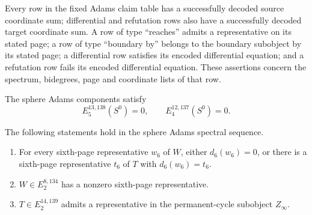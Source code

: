 \begin{theorem}
\label{frontier:AdamsCalculations:84a3eb0053cf}
Every row in the fixed Adams claim table has a successfully decoded source coordinate sum; differential and refutation rows also have a successfully decoded target coordinate sum. A row of type ``reaches'' admits a representative on its stated page; a row of type ``boundary by'' belongs to the boundary subobject by its stated page; a differential row satisfies its encoded differential equation; and a refutation row fails its encoded differential equation. These assertions concern the spectrum, bidegrees, page and coordinate lists of that row.
\end{theorem}

\begin{theorem}
\label{frontier:AdamsCalculations:117e697ada3f}
The sphere Adams components satisfy
\[E_5^{13,138}(S^0)=0,\qquad E_4^{12,137}(S^0)=0.\]

The following statements hold in the sphere Adams spectral sequence.
\begin{enumerate}
\item For every sixth-page representative $w_6$ of $W$, either $d_6(w_6)=0$, or there is a sixth-page representative $t_6$ of $T$ with $d_6(w_6)=t_6$.
\item $W\in E_2^{8,134}$ has a nonzero sixth-page representative.
\item $T\in E_2^{14,139}$ admits a representative in the permanent-cycle subobject $Z_\infty$.
\end{enumerate}

\end{theorem}
